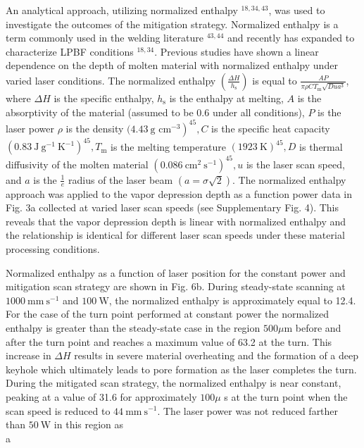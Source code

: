 \documentclass[10pt]{article}
\begin{document}
An analytical approach, utilizing normalized enthalpy ${ }^{18,34,43}$, was used to investigate the outcomes of the mitigation strategy. Normalized enthalpy is a term commonly used in the welding literature ${ }^{43,44}$ and recently has expanded to characterize LPBF conditions $^{18,34}$. Previous studies have shown a linear dependence on the depth of molten material with normalized enthalpy under varied laser conditions. The normalized enthalpy $\left(\frac{\Delta H}{h_{\mathrm{s}}}\right)$ is equal to $\frac{A P}{\pi \rho C T_{\mathrm{m}} \sqrt{D u a^{3}}}$, where $\Delta H$ is the specific enthalpy, $h_{\mathrm{s}}$ is the enthalpy at melting, $A$ is the absorptivity of the material (assumed to be 0.6 under all conditions), $P$ is the laser power $\rho$ is the density $(4.43 \mathrm{~g}$ $\left.\mathrm{cm}^{-3}\right)^{45}, C$ is the specific heat capacity $\left(0.83 \mathrm{~J} \mathrm{~g}^{-1} \mathrm{~K}^{-1}\right)^{45}, T_{\mathrm{m}}$ is the melting temperature $(1923 \mathrm{~K})^{45}, D$ is thermal diffusivity of the molten material $\left(0.086 \mathrm{~cm}^{2} \mathrm{~s}^{-1}\right)^{45}, u$ is the laser scan speed, and $a$ is the $\frac{1}{e}$ radius of the laser beam $(a=\sigma \sqrt{2})$. The normalized enthalpy approach was applied to the vapor depression depth as a function power data in Fig. 3a collected at varied laser scan speeds (see Supplementary Fig. 4). This reveals that the vapor depression depth is linear with normalized enthalpy and the relationship is identical for different laser scan speeds under these material processing conditions.

Normalized enthalpy as a function of laser position for the constant power and mitigation scan strategy are shown in Fig. 6b. During steady-state scanning at $1000 \mathrm{~mm} \mathrm{~s}^{-1}$ and $100 \mathrm{~W}$, the normalized enthalpy is approximately equal to 12.4. For the case of the turn point performed at constant power the normalized enthalpy is greater than the steady-state case in the region $500 \mu \mathrm{m}$ before and after the turn point and reaches a maximum value of 63.2 at the turn. This increase in $\Delta H$ results in severe material overheating and the formation of a deep keyhole which ultimately leads to pore formation as the laser completes the turn. During the mitigated scan strategy, the normalized enthalpy is near constant, peaking at a value of 31.6 for approximately $100 \mu$ s at the turn point when the scan speed is reduced to $44 \mathrm{~mm} \mathrm{~s}^{-1}$. The laser power was not reduced farther than $50 \mathrm{~W}$ in this region as\\
a
\end{document}

